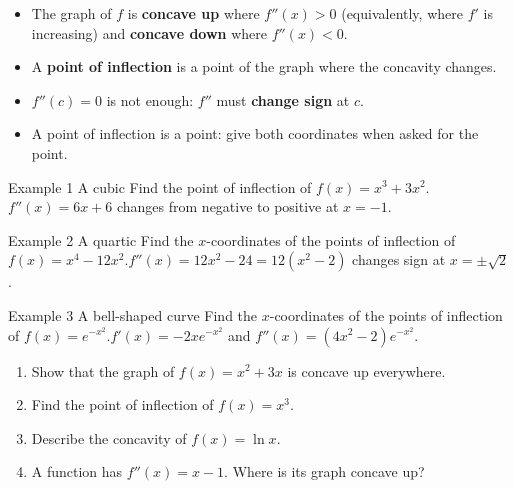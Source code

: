 \documentclass[11pt]{article}
\begin{document}

\begin{ideabox}
\begin{itemize}[leftmargin=*,itemsep=2pt,topsep=2pt]
  \item The graph of $f$ is \textbf{concave up} where $f''(x)>0$ (equivalently, where $f'$ is increasing) and \textbf{concave down} where $f''(x)<0$.
  \item A \textbf{point of inflection} is a point of the graph where the concavity changes.
  \item $f''(c)=0$ is not enough: $f''$ must \textbf{change sign} at $c$.
  \item A point of inflection is a point: give both coordinates when asked for the point.
\end{itemize}
\end{ideabox}

\begin{example}{Example 1 \textperiodcentered{} A cubic}
Find the point of inflection of $f(x)=x^3+3x^2$.\soln $f''(x)=6x+6$ changes from negative to positive at $x=-1$.
\end{example}

\begin{example}{Example 2 \textperiodcentered{} A quartic}
Find the $x$-coordinates of the points of inflection of $f(x)=x^4-12x^2$.\soln $f''(x)=12x^2-24=12\left(x^2-2\right)$ changes sign at $x=\pm\sqrt2$.
\end{example}

\begin{example}{Example 3 \textperiodcentered{} A bell-shaped curve}
Find the $x$-coordinates of the points of inflection of $f(x)=e^{-x^2}$.\soln $f'(x)=-2xe^{-x^2}$ and $f''(x)=\left(4x^2-2\right)e^{-x^2}$.
\end{example}

\newpage
{}

\begin{enumerate}[leftmargin=*,itemsep=2pt]
  \item Show that the graph of $f(x)=x^2+3x$ is concave up everywhere.\work{2.3cm}
  \item Find the point of inflection of $f(x)=x^3$.\work{2.3cm}
  \item Describe the concavity of $f(x)=\ln x$.\work{2.3cm}
  \item A function has $f''(x)=x-1$. Where is its graph concave up?\work{2.3cm}
\end{enumerate}
\end{document}
